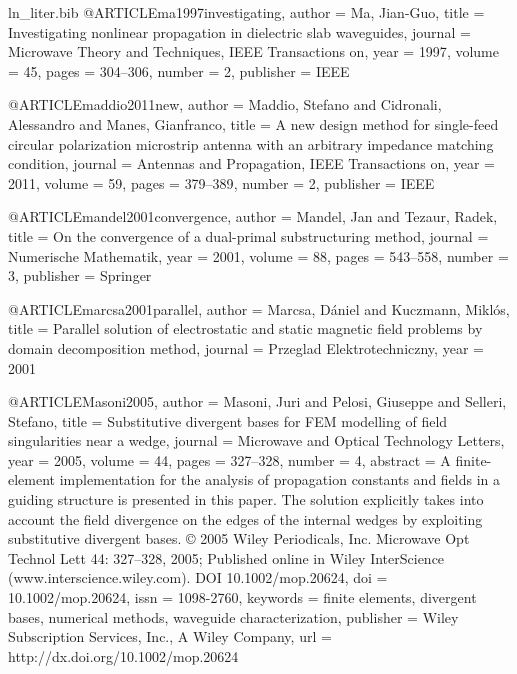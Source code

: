 \begin{filecontents*}{ln_liter.bib}
@ARTICLE{ma1997investigating,
  author = {Ma, Jian-Guo},
  title = {Investigating nonlinear propagation in dielectric slab waveguides},
  journal = {Microwave Theory and Techniques, IEEE Transactions on},
  year = {1997},
  volume = {45},
  pages = {304--306},
  number = {2},
  publisher = {IEEE}
}

@ARTICLE{maddio2011new,
  author = {Maddio, Stefano and Cidronali, Alessandro and Manes, Gianfranco},
  title = {A new design method for single-feed circular polarization microstrip
	antenna with an arbitrary impedance matching condition},
  journal = {Antennas and Propagation, IEEE Transactions on},
  year = {2011},
  volume = {59},
  pages = {379--389},
  number = {2},
  publisher = {IEEE}
}

@ARTICLE{mandel2001convergence,
  author = {Mandel, Jan and Tezaur, Radek},
  title = {On the convergence of a dual-primal substructuring method},
  journal = {Numerische Mathematik},
  year = {2001},
  volume = {88},
  pages = {543--558},
  number = {3},
  publisher = {Springer}
}

@ARTICLE{marcsa2001parallel,
  author = {Marcsa, D{\'a}niel and Kuczmann, Mikl{\'o}s},
  title = {Parallel solution of electrostatic and static magnetic field problems
	by domain decomposition method},
  journal = {Przeglad Elektrotechniczny},
  year = {2001}
}

@ARTICLE{Masoni2005,
  author = {Masoni, Juri and Pelosi, Giuseppe and Selleri, Stefano},
  title = {Substitutive divergent bases for {FEM} modelling of field singularities
	near a wedge},
  journal = {Microwave and Optical Technology Letters},
  year = {2005},
  volume = {44},
  pages = {327--328},
  number = {4},
  abstract = {A finite-element implementation for the analysis of propagation constants
	and fields in a guiding structure is presented in this paper. The
	solution explicitly takes into account the field divergence on the
	edges of the internal wedges by exploiting substitutive divergent
	bases. © 2005 Wiley Periodicals, Inc. Microwave Opt Technol Lett
	44: 327–328, 2005; Published online in Wiley InterScience (www.interscience.wiley.com).
	DOI 10.1002/mop.20624},
  doi = {10.1002/mop.20624},
  issn = {1098-2760},
  keywords = {finite elements, divergent bases, numerical methods, waveguide characterization},
  publisher = {Wiley Subscription Services, Inc., A Wiley Company},
  url = {http://dx.doi.org/10.1002/mop.20624}
}


\end{filecontents*}

